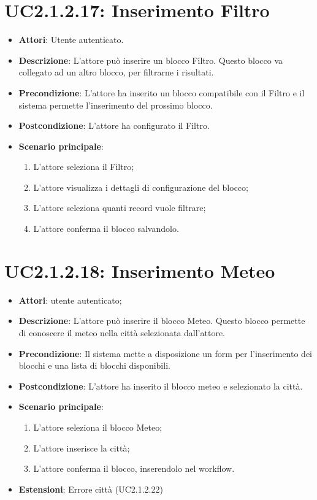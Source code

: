 \section{UC2.1.2.17: Inserimento Filtro}
\label{UC2.1.2.17}
\begin{itemize}
	\item \textbf{Attori}: Utente autenticato.
	\item \textbf{Descrizione}: L'attore può inserire un blocco Filtro. Questo blocco va collegato ad un altro blocco, per filtrarne i risultati. 
	\item \textbf{Precondizione}: L'attore ha inserito un blocco compatibile con il Filtro e il sistema permette l'inserimento del prossimo blocco.
	\item \textbf{Postcondizione}: L'attore ha configurato il Filtro. 
	\item \textbf{Scenario principale}:
	\begin{enumerate} \item L'attore seleziona il Filtro; \item L'attore visualizza i dettagli di configurazione del blocco; \item  L'attore seleziona quanti record vuole filtrare; \item L'attore conferma il blocco salvandolo.\end{enumerate}
\end{itemize}

\section{UC2.1.2.18: Inserimento Meteo}
\label{UC2.1.2.18}
\begin{itemize}
	\item \textbf{Attori}: utente autenticato;
	\item \textbf{Descrizione}: L'attore può inserire il blocco Meteo. Questo blocco permette di conoscere il meteo nella città selezionata dall'attore.
	\item \textbf{Precondizione}: Il sistema mette a disposizione un form per l'inserimento dei blocchi e una lista di blocchi disponibili.	
	\item \textbf{Postcondizione}: L'attore ha inserito il blocco meteo e selezionato la città.
	\item \textbf{Scenario principale}:
	\begin{enumerate} \item L'attore seleziona il blocco Meteo;  \item  L'attore inserisce la città; \item L'attore conferma il blocco, inserendolo nel workflow. \end{enumerate}
	\item \textbf{Estensioni}:
	Errore città (UC2.1.2.22)
\end{itemize}

